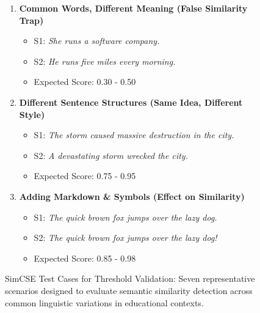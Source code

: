 \begin{figure}[htbp]
{\begin{minipage}{0.95\textwidth}
\begin{enumerate}
        \item \textbf{Common Words, Different Meaning (False Similarity Trap)}
        \begin{itemize}
            \item S1: \textit{She runs a software company.}
            \item S2: \textit{He runs five miles every morning.}
            \item Expected Score: 0.30 - 0.50
        \end{itemize}
        
        \item \textbf{Different Sentence Structures (Same Idea, Different Style)}
        \begin{itemize}
            \item S1: \textit{The storm caused massive destruction in the city.}
            \item S2: \textit{A devastating storm wrecked the city.}
            \item Expected Score: 0.75 - 0.95
        \end{itemize}
        
        \item \textbf{Adding Markdown \& Symbols (Effect on Similarity)}
        \begin{itemize}
            \item S1: \textit{The quick brown fox jumps over the lazy dog.}
            \item S2: \textit{The quick brown fox jumps over the lazy dog!}
            \item Expected Score: 0.85 - 0.98
        \end{itemize}
    \end{enumerate}
    \end{minipage}}
    \caption{SimCSE Test Cases for Threshold Validation: Seven representative scenarios designed to evaluate semantic similarity detection across common linguistic variations in educational contexts.}
    \label{fig:simcse_test_cases}
\end{figure}